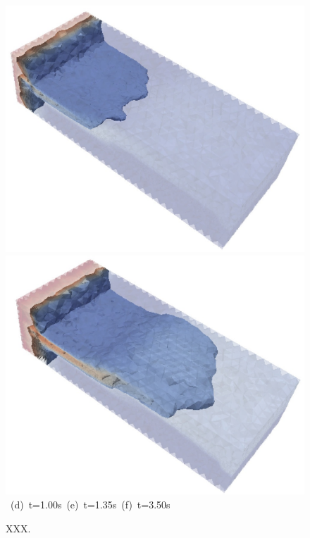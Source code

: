 \begin{landscape}
\begin{figure}[ht]
{{            \includegraphics[width=.45\textwidth]{./Pics1/3D_Channel/3D_Channel_Saturation1Isosurface_D150c}
            \includegraphics[width=.45\textwidth]{./Pics1/3D_Channel/3D_Channel_Saturation1Isosurface_D400c} }
      \hbox{\hspace{3.cm} (d) t=1.00s \hspace{3.cm} (e) t=1.35s\hspace{4.cm} (f) t=3.50s }}
\caption{XXX.}
\label{fig:3DChannel_Isosurf}
\end{figure}
\end{landscape}
\clearpage

